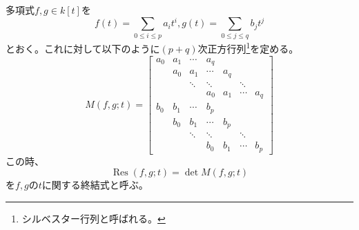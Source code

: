 \documentclass[a4paper]{jsarticle}
\newcommand{\Res}{\operatorname{Res}}
\begin{document}
        \begin{Def}
            多項式$f, g \in k[t]$を
            \[ f(t)=\sum_{0 \leq i \leq p}{a_{i}t^{i}}, g(t)=\sum_{0 \leq j \leq q}{b_{j}t^{j}} \]
            とおく。これに対して以下のように$(p+q)$次正方行列\footnote{シルベスター行列と呼ばれる。}を定める。
            \[
                M(f,g; t)=
                \begin{bmatrix}
                    a_0&    a_1&    \cdots&     a_q \\
                    {}&     a_0&    a_1&        \cdots&     a_q \\
                    {}&     {}&     \ddots&     \ddots&     {}&     \ddots& \\
                    {}&     {}&     {}&         a_0&        a_1&    \cdots&    a_q \\
                    b_0&    b_1&    \cdots&     b_p \\
                    {}&     b_0&    b_1&        \cdots&     b_p \\
                    {}&     {}&     \ddots&     \ddots&     {}&     \ddots& \\
                    {}&     {}&     {}&         b_0&        b_1&    \cdots&    b_p
                \end{bmatrix}
            \]
            この時、
            \[ \Res(f,g; t)=\det M(f,g; t) \]
            を$f,g$の$t$に関する終結式と呼ぶ。
        \end{Def}
\end{document}
